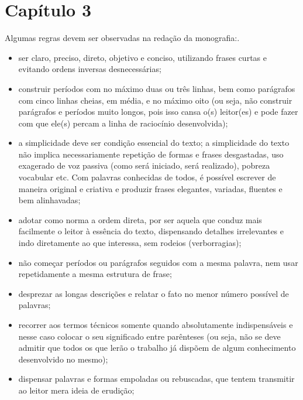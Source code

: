 \chapter{Capítulo 3}

Algumas regras devem ser observadas na redação da monografia:.


	\begin{itemize}
		\item ser claro, preciso, direto, objetivo e conciso, utilizando frases curtas e evitando ordens inversas desnecessárias;
		
		\item construir períodos com no máximo duas ou três linhas, bem como parágrafos com cinco linhas cheias, em média, e no máximo oito (ou seja, não construir parágrafos e períodos muito longos, pois isso cansa o(s) leitor(es) e pode fazer com que ele(s) percam a linha de raciocínio desenvolvida);
		
		\item a simplicidade deve ser condição essencial do texto; a simplicidade do texto não implica necessariamente repetição de formas e frases desgastadas, uso exagerado de voz passiva (como será iniciado, será realizado), pobreza vocabular etc. Com palavras conhecidas de todos, é possível escrever de maneira original e criativa e produzir frases elegantes, variadas, fluentes e bem alinhavadas;
		
		\item adotar como norma a ordem direta, por ser aquela que conduz mais facilmente o leitor à essência do texto, dispensando detalhes irrelevantes e indo diretamente ao que interessa, sem rodeios (verborragias);

		\item não começar períodos ou parágrafos seguidos com a mesma palavra, nem usar repetidamente a mesma estrutura de frase;

		\item desprezar as longas descrições e relatar o fato no menor número possível de palavras;
		
		\item recorrer aos termos técnicos somente quando absolutamente indispensáveis e nesse caso colocar o seu significado entre parênteses (ou seja, não se deve admitir que todos os que lerão o trabalho já dispõem de algum conhecimento desenvolvido no mesmo);
		
		\item dispensar palavras e formas empoladas ou rebuscadas, que tentem transmitir ao leitor mera ideia de erudição;


\end{itemize}
